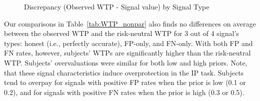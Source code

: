 \documentclass[12pt,a4paper]{article}
\begin{document}
\begin{figure}[H]\centering 
	\caption{Discrepancy (Observed WTP - Signal value) by Signal Type} \label{fig:WTPhist}
	\hfill
	\hfill
	\vspace{2em}
	\hfill
	\hfill

\end{figure}

Our comparisons in Table~\ref{tab:WTP_nonpar} also finds no differences on average between the observed WTP and the risk-neutral WTP for 3 out of 4 signal's types: honest (i.e., perfectly accurate), FP-only, and FN-only. With both FP and FN rates, however, subjects' WTPs are significantly higher than the risk-neutral WTP. Subjects' overvaluations were similar for both low and high priors. Note, that these signal characteristics induce overprotection in the IP task. Subjects tend to overpay for signals with positive FP rates when the prior is low (0.1 or 0.2), and for signals with positive FN rates when the prior is high (0.3 or 0.5).
\end{document}
